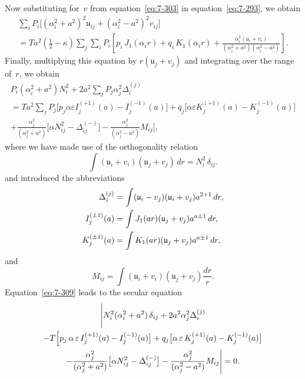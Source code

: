 Now substituting for~$v$ from equation~\eqref{eq:7-303} in equation~\eqref{eq:7-293}, we obtain
\begin{multline}
\label{eq:7-308}
\sum_i P_i\bigl[(\alpha_i^2+a^2)^2\mathfrak{u}_{ij} + (\alpha_i^2-a^2)^2v_{ij}\bigr] \\
= Ta^2\!\left(\tfrac{1}{2}-\kappa\right)\sum_j \sum_i P_i\!\left[
  p_i\,J_1(\alpha_i r) + q_i\,K_1(\alpha_i r)
  + \frac{\alpha_i^2(\mathfrak{u}_i + v_i)}{(\alpha_i^2+a^2)(\alpha_i^2-a^2)}
\right].
\end{multline}
Finally, multiplying this equation by $r(\mathfrak{u}_j + v_j)$ and integrating over the
range of~$r$, we obtain
\begin{multline}
\label{eq:7-309}
P_i(\alpha_i^2+a^2)N_i^2 + 2a^2\sum_j P_j \alpha_j^2 \Delta_i^{(j)} \\
= Ta^2\sum_j P_j\bigl[p_j \alpha \varepsilon I_j^{(+1)}(a)
  - I_j^{(-1)}(a)\bigr]
  + q_j\bigl[\alpha \varepsilon K_j^{(+1)}(a) - K_j^{(-1)}(a)\bigr] \\
  + \frac{\alpha_j^2}{(\alpha_j^2+a^2)}
    \bigl[\alpha N_{ij}^2 - \Delta_{ij}^{(-)}\bigr]
  - \frac{\alpha_j^2}{(\alpha_j^2-a^2)} M_{ij}\Biggr],
\end{multline}
where we have made use of the orthogonality relation
\begin{equation}
\label{eq:7-310}
\int (\mathfrak{u}_i+v_i)(\mathfrak{u}_j+v_j)\,dr = N_i^2\,\delta_{ij}.
\end{equation}
and introduced the abbreviations
\begin{align}
\label{eq:7-311}
\Delta_i^{(j)} &= \int (\mathfrak{u}_i-v_j)(\mathfrak{u}_i+v_j)a^{2+1}\,dr, \notag\\
I_j^{(\pm 1)}(a) &= \int J_1(ar)(\mathfrak{u}_j+v_j)a^{a\pm 1}\,dr, \notag\\
K_j^{(\pm 1)}(a) &= \int K_1(ar)(\mathfrak{u}_j+v_j)a^{a\pm 1}\,dr,
\end{align}
and
\begin{equation}
\label{eq:7-312}
M_{ij} = \int (\mathfrak{u}_i+v_i)(\mathfrak{u}_j+v_j)\frac{dr}{r}.
\end{equation}
Equation~\eqref{eq:7-309} leads to the secular equation
\begin{multline}
\label{eq:7-313}
\Biggl|N_i^2(\alpha_i^2+a^2)\,\delta_{ij}
  + 2a^2\alpha_j^2\Delta_i^{(j)} \\
-T\Bigl[p_j\,\alpha\,\varepsilon\,I_j^{(+1)}(a)
  - I_j^{(-1)}(a)\bigr]
  + q_j\bigl[\alpha\,\varepsilon\,K_j^{(+1)}(a) - K_j^{(-1)}(a)\bigr] \\
  - \frac{\alpha_j^2}{(\alpha_j^2+a^2)}
    \bigl[\alpha N_{ij}^2 - \Delta_{ij}^{(-)}\bigr]
  - \frac{\alpha_j^2}{(\alpha_j^2-a^2)}M_{ij}\Biggr|
= 0.
\end{multline}

